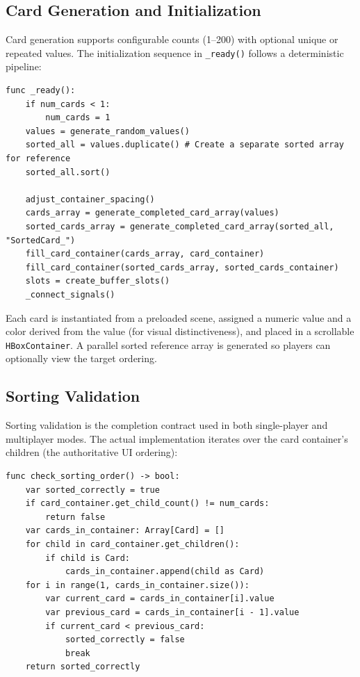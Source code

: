 \subsection{Card Generation and Initialization}
\label{subsec:card-generation}

Card generation supports configurable counts (1--200) with optional unique or repeated values. The initialization sequence in \texttt{\_ready()} follows a deterministic pipeline:

\begin{lstlisting}[caption={Card manager initialization pipeline (card\_manager.gd)}]
func _ready():
    if num_cards < 1:
        num_cards = 1
    values = generate_random_values()
    sorted_all = values.duplicate() # Create a separate sorted array for reference
    sorted_all.sort()

    adjust_container_spacing()
    cards_array = generate_completed_card_array(values)
    sorted_cards_array = generate_completed_card_array(sorted_all, "SortedCard_")
    fill_card_container(cards_array, card_container)
    fill_card_container(sorted_cards_array, sorted_cards_container)
    slots = create_buffer_slots()
    _connect_signals()
\end{lstlisting}

Each card is instantiated from a preloaded scene, assigned a numeric value and a color derived from the value (for visual distinctiveness), and placed in a scrollable \texttt{HBoxContainer}. A parallel sorted reference array is generated so players can optionally view the target ordering.

\subsection{Sorting Validation}
\label{subsec:sorting-validation}

Sorting validation is the completion contract used in both single-player and multiplayer modes. The actual implementation iterates over the card container's children (the authoritative UI ordering):

\begin{lstlisting}[caption={Sorting validation (card\_manager.gd, line 645)}]
func check_sorting_order() -> bool:
    var sorted_correctly = true
    if card_container.get_child_count() != num_cards:
        return false
    var cards_in_container: Array[Card] = []
    for child in card_container.get_children():
        if child is Card:
            cards_in_container.append(child as Card)
    for i in range(1, cards_in_container.size()):
        var current_card = cards_in_container[i].value
        var previous_card = cards_in_container[i - 1].value
        if current_card < previous_card:
            sorted_correctly = false
            break
    return sorted_correctly
\end{lstlisting}

